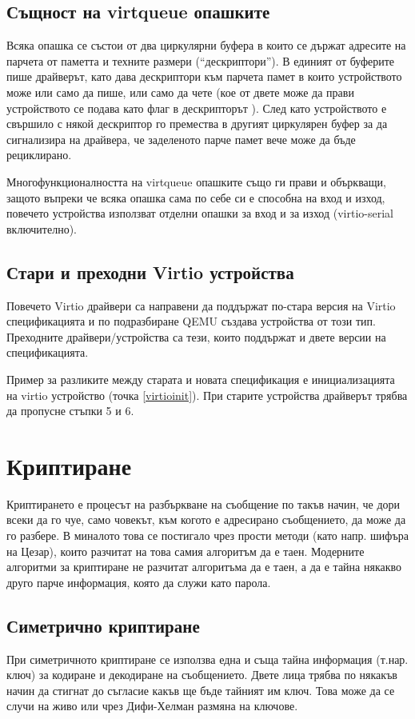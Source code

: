   \subsection{Същност на virtqueue опашките}
  Всяка опашка се състои от два циркулярни буфера в които се държат адресите на парчета от паметта и техните размери (``дескриптори'').\cite[глава~2]{virtiodocs} В единият от буферите пише драйверът, като дава дескриптори към парчета памет в които устройството може или само да пише, или само да чете (кое от двете може да прави устройството се подава като флаг в дескрипторът \cite[глава~2.4.5]{virtiodocs}). След като устройството е свършило с някой дескриптор го премества в другият циркулярен буфер за да сигнализира на драйвера, че заделеното парче памет вече може да бъде рециклирано.

  Многофункционалността на virtqueue опашките също ги прави и объркващи, защото въпреки че всяка опашка сама по себе си е способна на вход и изход, повечето устройства използват отделни опашки за вход и за изход (virtio-serial включително).

  \subsection{Стари и преходни Virtio устройства}
  Повечето Virtio драйвери са направени да поддържат по-стара версия на Virtio спецификацията и по подразбиране QEMU създава устройства от този тип. Преходните драйвери/устройства са тези, които поддържат и двете версии на спецификацията.

  Пример за разликите между старата и новата спецификация е инициализацията на virtio устройство (точка \ref{virtioinit}). При старите устройства драйверът трябва да пропусне стъпки 5 и 6.\cite[глава~3.1.2]{virtiodocs}

\section{Криптиране}
Криптирането е процесът на разбъркване на съобщение по такъв начин, че дори всеки да го чуе, само човекът, към когото е адресирано съобщението, да може да го разбере. В миналото това се постигало чрез прости методи (като напр. шифъра на Цезар), които разчитат на това самия алгоритъм да е таен. Модерните алгоритми за криптиране не разчитат алгоритъма да е таен, а да е тайна някакво друго парче информация, която да служи като парола.

  \subsection{Симетрично криптиране}
  При симетричното криптиране се използва една и съща тайна информация (т.нар. ключ) за кодиране и декодиране на съобщението. Двете лица трябва по някакъв начин да стигнат до съгласие какъв ще бъде тайният им ключ. Това може да се случи на живо или чрез Дифи-Хелман размяна на ключове.

